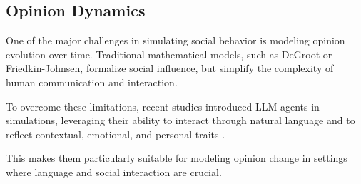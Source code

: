 \subsection{Opinion Dynamics}
One of the major challenges in simulating social behavior is modeling opinion evolution over time.
Traditional mathematical models, such as DeGroot or Friedkin-Johnsen, formalize social influence, but simplify the complexity of human communication and interaction.

To overcome these limitations, recent studies introduced LLM agents in simulations, leveraging their ability to interact through natural language and to reflect contextual, emotional, and personal traits \cite{piao2025emergencehumanlikepolarizationlarge}. 

This makes them particularly suitable for modeling opinion change in settings where language and social interaction are crucial.

